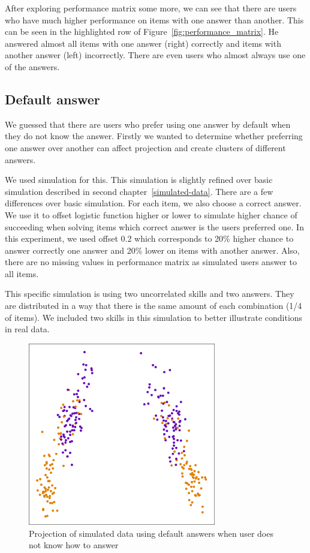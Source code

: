 \documentclass[
  printed, %
  table,   %
  nolof,     %
  nolot,     %
  color,
  final,
  nocover
]{fithesis3}
\begin{document}
After exploring performance matrix some more, we can see that there are users who have much higher performance on items with one answer than another. This can be seen in the highlighted row of Figure~\ref{fig:performance_matrix}. He answered almost all items with one answer (right) correctly and items with another answer (left) incorrectly. There are even users who almost always use one of the answers.


\subsection{Default answer}\label{default-answer}

We guessed that there are users who prefer using one answer by default when they do not know the answer. Firstly we wanted to determine whether preferring one answer over another can affect projection and create clusters of different answers.

We used simulation for this. This simulation is slightly refined over basic simulation described in second chapter~\ref{simulated-data}. There are a few differences over basic simulation. For each item, we also choose a correct answer. We use it to offset logistic function higher or lower to simulate higher chance of succeeding when solving items which correct answer is the users preferred one. In this experiment, we used offset 0.2 which corresponds to 20\% higher chance to answer correctly one answer and 20\% lower on items with another answer. Also, there are no missing values in performance matrix as simulated users answer to all items.

This specific simulation is using two uncorrelated skills and two answers. They are distributed in a way that there is the same amount of each combination (1/4 of items). We included two skills in this simulation to better illustrate conditions in real data.

\begin{figure}
  \includegraphics[height=8cm]{img/simulated_default}
  \caption{Projection of simulated data using default answers when user does not know how to answer}
  \label{fig:simulated_default}
\end{figure}
\end{document}
